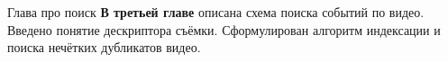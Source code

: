 \documentclass{.local/lib/classes/ndvr-super-article-standalone}
\begin{document}
    \begin{content-item}{Глава про поиск}
        \textbf{В третьей главе}  описана схема поиска 
        событий по видео. Введено понятие дескриптора съёмки.
        Сформулирован алгоритм индексации и поиска
        нечётких дубликатов видео.


    \end{content-item}
\end{document}
